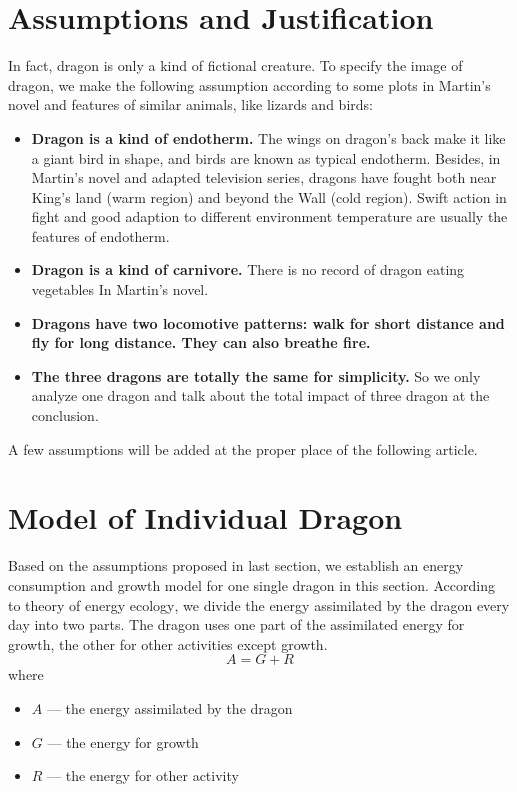 \documentclass{mcmthesis}
\newcommand{\upcite}[1]{\textsuperscript{\textsuperscript{\cite{#1}}}}
\begin{document}
\section{Assumptions and Justification}
In fact, dragon is only a kind of fictional creature. To specify the image of dragon, we make the following assumption according to some plots in Martin's novel and features of similar animals, like lizards and birds:
\begin{itemize}
\item \textbf{Dragon is a kind of endotherm.} The wings on dragon's back make it like a giant bird in shape, and birds are known as typical endotherm. Besides, in Martin's novel and adapted television series, dragons have fought both near King's land (warm region) and beyond the Wall (cold region). Swift action in fight and good adaption to different environment temperature are usually the features of endotherm.
\item \textbf{Dragon is a kind of carnivore.} There is no record of dragon eating vegetables In Martin's novel.
\item \textbf{Dragons have two locomotive patterns: walk for short distance and fly for long distance. They can also breathe fire.}
\item \textbf{The three dragons are totally the same for simplicity.} So we only analyze one dragon and talk about the total impact of three dragon at the conclusion.
\end{itemize}
A few assumptions will be added at the proper place of the following article.

\section{Model of Individual Dragon}
Based on the assumptions proposed in last section, we establish an energy consumption and growth model for one single dragon in this section. According to theory of energy ecology\upcite{lu1987energy}, we divide the energy assimilated by the dragon every day into two parts. The dragon uses one part of the assimilated energy for growth, the other for other activities except growth.
\begin{equation}
\label{A}
A=G+R
\end{equation}
where \begin{itemize}
\item $A$ --- the energy assimilated by the dragon
\item $G$ --- the energy for growth
\item $R$ --- the energy for other activity
\end{itemize}
\end{document}
